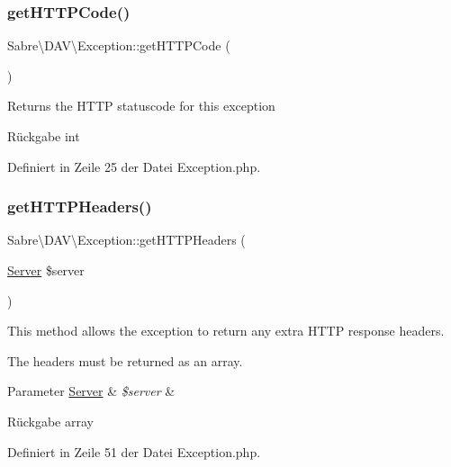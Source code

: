 \subsubsection{\texorpdfstring{get\+H\+T\+T\+P\+Code()}{getHTTPCode()}}
{\footnotesize\ttfamily Sabre\textbackslash{}\+D\+A\+V\textbackslash{}\+Exception\+::get\+H\+T\+T\+P\+Code (\begin{DoxyParamCaption}{ }\end{DoxyParamCaption})}

Returns the H\+T\+TP statuscode for this exception

\begin{DoxyReturn}{Rückgabe}
int 
\end{DoxyReturn}


Definiert in Zeile 25 der Datei Exception.\+php.

\mbox{\label{class_sabre_1_1_d_a_v_1_1_exception_aa8737888d98bfdeb5b09e202a5086e4b}} 
\subsubsection{\texorpdfstring{get\+H\+T\+T\+P\+Headers()}{getHTTPHeaders()}}
{\footnotesize\ttfamily Sabre\textbackslash{}\+D\+A\+V\textbackslash{}\+Exception\+::get\+H\+T\+T\+P\+Headers (\begin{DoxyParamCaption}\item[{\mbox{\hyperlink{class_sabre_1_1_d_a_v_1_1_server}{Server}}}]{\$server }\end{DoxyParamCaption})}

This method allows the exception to return any extra H\+T\+TP response headers.

The headers must be returned as an array.


\begin{DoxyParams}[1]{Parameter}
\mbox{\hyperlink{class_sabre_1_1_d_a_v_1_1_server}{Server}} & {\em \$server} & \\
\hline
\end{DoxyParams}
\begin{DoxyReturn}{Rückgabe}
array 
\end{DoxyReturn}


Definiert in Zeile 51 der Datei Exception.\+php.

